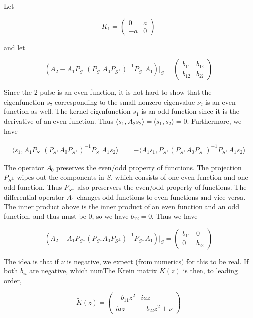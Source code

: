 \documentclass[12pt]{article}
\begin{document}
Let 

\[
K_1 = \begin{pmatrix} 0 & a \\ -a & 0 \end{pmatrix}
\]

and let

\[
\left( A_2 - A_1 P_{S^\perp} (P_{S^\perp} A_0 P_{S^\perp})^{-1} P_{S^\perp} A_1 \right)|_S = \begin{pmatrix} b_{11} & b_{12} \\ b_{12} & b_{22} \end{pmatrix}
\]

Since the 2-pulse is an even function, it is not hard to show that the eigenfunction $s_2$ corresponding to the small nonzero eigenvalue $\nu_2$ is an even function as well. The kernel eigenfunction $s_1$ is an odd function since it is the derivative of an even function. Thus $\langle s_1, A_2 s_2 \rangle = \langle s_1, s_2 \rangle = 0$. Furthermore, we have

\begin{align*}
\langle s_1, A_1 P_{S^\perp} (P_{S^\perp} A_0 P_{S^\perp})^{-1} P_{S^\perp} A_1 s_2 \rangle 
&= -\langle A_1 s_1, P_{S^\perp} (P_{S^\perp} A_0 P_{S^\perp})^{-1} P_{S^\perp} A_1 s_2 \rangle 
\end{align*}

The operator $A_0$ preserves the even/odd property of functions. The projection $P_{S^\perp}$ wipes out the components in $S$, which consists of one even function and one odd function. Thus $P_{S^\perp}$ also preservers the even/odd property of functions. The differential operator $A_1$ changes odd functions to even functions and vice versa. The inner product above is the inner product of an even function and an odd function, and thus must be 0, so we have $b_{12} = 0$. Thus we have

\[
\left( A_2 - A_1 P_{S^\perp} (P_{S^\perp} A_0 P_{S^\perp})^{-1} P_{S^\perp} A_1 \right)|_S = \begin{pmatrix} b_{11} & 0 \\ 0 & b_{22} \end{pmatrix}
\]

The idea is that if $\nu$ is negative, we expect (from numerics) for this to be real. If both $b_{ii}$ are negative, which numThe Krein matrix $K(z)$ is then, to leading order,

\begin{equation}
\tilde{K}(z) = \begin{pmatrix}
-b_{11} z^2 & i a z \\
i a z & -b_{22} z^2 + \nu
\end{pmatrix}
\end{equation}
\end{document}

